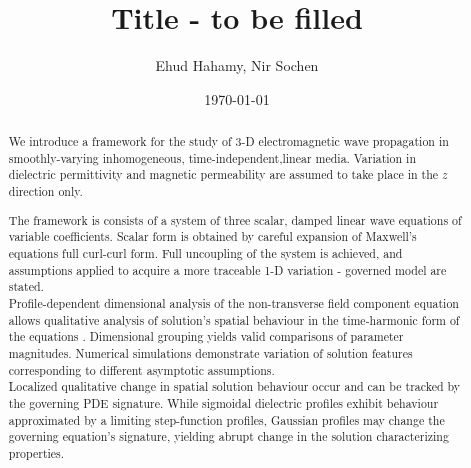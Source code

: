 \documentclass[twocolumn,secnumarabic,amssymb, nobibnotes, aps, prd]{revtex4-1}
\begin{document}
\title{Title - to be filled}%

\author{Ehud Hahamy, Nir Sochen}%
\date{\today}%
\begin{abstract}
We introduce a framework for the study of 3-D electromagnetic wave propagation in smoothly-varying inhomogeneous, time-independent,linear media. Variation in dielectric permittivity and magnetic permeability  are assumed to take place in the $z$ direction only.
 
The framework is consists of a system of three scalar, damped linear wave equations of variable coefficients. Scalar form is obtained by  careful expansion of Maxwell's equations full curl-curl form.  
Full uncoupling of the system is achieved, and assumptions applied to acquire a more traceable 1-D variation - governed model are stated.\\
Profile-dependent dimensional analysis of the non-transverse field component equation allows qualitative analysis of solution's spatial behaviour in the time-harmonic form of the equations .
Dimensional grouping yields valid comparisons of parameter magnitudes. Numerical simulations demonstrate variation of solution features corresponding to different asymptotic assumptions. \\
Localized qualitative change in spatial solution behaviour occur and can be tracked by the governing PDE signature. While sigmoidal dielectric profiles exhibit behaviour approximated by a limiting step-function profiles, Gaussian profiles may change the  governing equation's signature, yielding abrupt change in the solution characterizing properties.  

\end{abstract}
\maketitle
\end{document}
